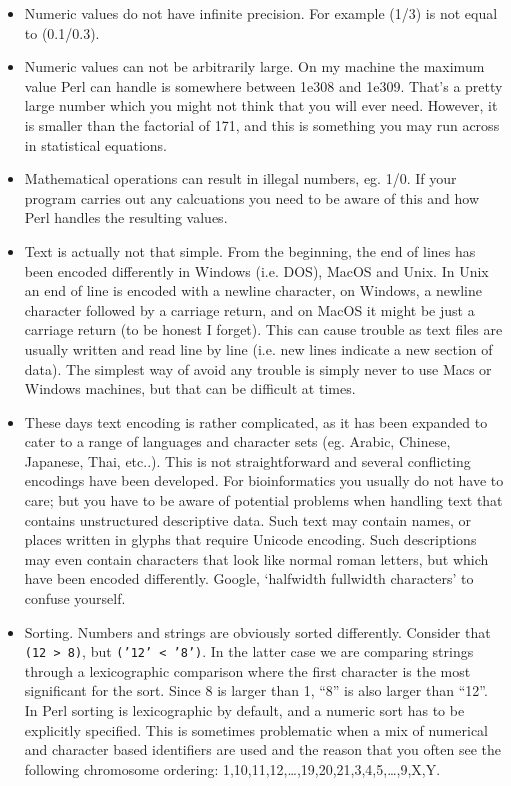 \documentclass[11pt]{article}
\begin{document}
\begin{itemize}
\item Numeric values do not have infinite precision. For example (1/3) is
  not equal to (0.1/0.3).
\item Numeric values can not be arbitrarily large. On my machine the
  maximum value Perl can handle is somewhere between 1e308 and
  1e309. That's a pretty large number which you might not think that
  you will ever need.  However, it is smaller than the factorial of
  171, and this is something you may run across in statistical
  equations.
\item Mathematical operations can result in illegal numbers, eg. 1/0. If
  your program carries out any calcuations you need to be aware of
  this and how Perl handles the resulting values.
\item Text is actually not that simple. From the beginning, the end of
  lines has been encoded differently in Windows (i.e. DOS), MacOS and
  Unix. In Unix an end of line is encoded with a newline character, on
  Windows, a newline character followed by a carriage return, and on
  MacOS it might be just a carriage return (to be honest I
  forget). This can cause trouble as text files are usually written
  and read line by line (i.e.  new lines indicate a new section of
  data). The simplest way of avoid any trouble is simply never to use
  Macs or Windows machines, but that can be difficult at times.
\item These days text encoding is rather complicated, as it has been
  expanded to cater to a range of languages and character sets
  (eg. Arabic, Chinese, Japanese, Thai, etc..). This is not
  straightforward and several conflicting encodings have been
  developed. For bioinformatics you usually do not have to care; but
  you have to be aware of potential problems when handling text that
  contains unstructured descriptive data. Such text may contain
  names, or places written in glyphs that require Unicode
  encoding. Such descriptions may even contain characters that look
  like normal roman letters, but which have been encoded differently.
  Google, `halfwidth fullwidth characters' to confuse yourself.
\item Sorting. Numbers and strings are obviously sorted
  differently. Consider that \texttt{(12 > 8)}, but \texttt{('12' < '8')}. In the latter
  case we are comparing strings through a lexicographic comparison
  where the first character is the most significant for the
  sort. Since 8 is larger than 1, ``8'' is also larger than ``12''. In
  Perl sorting is lexicographic by default, and a numeric sort has to
  be explicitly specified. This is sometimes problematic when a mix of
  numerical and character based identifiers are used and the reason
  that you often see the following chromosome ordering:
  1,10,11,12,\ldots{},19,20,21,3,4,5,\ldots{},9,X,Y.
\end{itemize}
\end{document}
